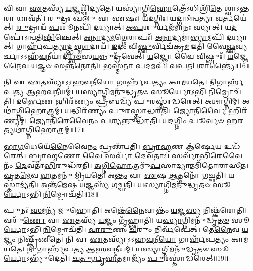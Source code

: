 𑌵𑌿 𑌵𑌾 \ul{𑌏}\-𑌤𑌸𑍍𑌯᳴ \ul{𑌯}\-𑌜𑍍𑌞𑌶𑍍𑌛𑌿᳴𑌦𑍍𑌯𑌤𑍇।
𑌯𑌸𑍍𑌯𑌾॑𑌗𑍍𑌨𑌿\-\ul{𑌹𑍋}\-𑌤𑍍𑌰𑍇᳴\-𑌽𑌧𑌿𑌶𑍍𑌰𑌿᳴\-\ul{𑌤𑍇} 𑌶𑍍𑌵𑌾\-𑌽\-\ul{𑌨𑍍𑌤}\-𑌰𑌾 𑌧𑌾𑌵᳴𑌤𑌿।
\-\ul{𑌰𑍁}\-𑌦𑍍𑌰𑌃 𑌖\-\ul{𑌲𑍁} 𑌵𑌾 \ul{𑌏}\-𑌷𑌃।
𑌯\-\ul{𑌦}\-𑌗𑍍𑌨𑌿𑌃।
𑌯𑌦𑍍𑌗𑌾𑌮᳴𑌨𑍍𑌵𑌤𑍍𑌯𑌾 \ul{𑌵}\-𑌰𑍍𑌤𑌯𑍇॑𑌤𑍍।
\-\ul{𑌰𑍁}\-𑌦𑍍𑌰𑌾𑌯᳴ \ul{𑌪}\-𑌶𑍂𑌨𑌪𑌿᳴ 𑌦𑌧𑍍𑌯𑌾𑌤𑍍।
\-\ul{𑌅}\-\-\ul{𑌪}\-𑌶𑍁𑌰𑍍𑌯𑌜᳴𑌮𑌾𑌨𑌃 𑌸𑍍𑌯𑌾𑌤𑍍।
𑌯\-\ul{𑌦}\-𑌪𑍋॑\-𑌽𑌨𑍍𑌵𑌤𑌿\-\ul{𑌷𑌿}\-𑌞𑍍𑌚𑍇𑌤𑍍।
\-\ul{𑌅}\-\-\ul{𑌨𑌾}\-𑌦𑍍𑌯\-\ul{𑌮}\-𑌗𑍍𑌨𑍇𑌰𑌾𑌪𑌃᳴।
\-\ul{𑌅}\-\-\ul{𑌨𑌾}\-𑌦𑍍𑌯𑌮𑌾॑\-\ul{𑌭𑍍𑌯𑌾}\-𑌮𑌪𑌿᳴ 𑌦𑌧𑍍𑌯𑌾𑌤𑍍।
𑌗𑌾𑌰𑍍\mbox{}𑌹᳴𑌪\-\ul{𑌤𑍍𑌯𑌾}\-𑌦𑍍𑌭\-\ul{𑌸𑍍𑌮𑌾}\-𑌦𑌾𑌯᳴।
\-\ul{𑌇}\-𑌦𑌂 𑌵𑌿\-\ul{𑌷𑍍𑌣𑍁}\-𑌰𑍍𑌵𑌿𑌚᳴𑌕𑍍𑌰\-\ul{𑌮} 𑌇𑌤𑌿᳴ 𑌵𑍈\-\ul{𑌷𑍍𑌣}\-𑌵𑍍𑌯𑌰𑍍𑌚𑌾\-𑌽𑌽𑌹᳴\-\ul{𑌵}\-𑌨𑍀𑌯𑌾॑𑌦𑍍‌\-\ul{𑌧𑍍𑌵}\-\-\ul{𑍞}\-𑌸\-\ul{𑌯}\-𑌨𑍍𑌨𑍁𑌦𑍍𑌰᳴𑌵𑍇𑌤𑍍।
\-\ul{𑌯}\-𑌜𑍍𑌞𑍋 𑌵𑍈 𑌵𑌿𑌷𑍍𑌣𑍁𑌃᳴।
\-\ul{𑌯}\-𑌜𑍍𑌞𑍇\-\ul{𑌨𑍈}\-𑌵 \ul{𑌯}\-𑌜𑍍𑌞𑍞 𑌸𑌨𑍍𑌤᳴𑌨𑍋𑌤𑌿।
𑌭𑌸𑍍𑌮᳴𑌨𑌾 \ul{𑌪}\-𑌦𑌮𑌪𑌿᳴ 𑌵𑌪\-\ul{𑌤𑌿} 𑌶𑌾𑌨𑍍𑌤𑍍𑌯𑍈॑॥16॥\anuvakamend[𑌵𑍈 \ul{𑌦𑍇}\-𑌵𑍍𑌯𑌦𑌿᳴𑌤𑌿𑌰𑍍𑌮𑍁𑌞𑍍𑌚𑌤𑌿 𑌸𑍃𑌜𑌤𑌿 𑌕𑌰𑍋𑌤𑌿 𑌕𑌰𑍋𑌤𑍍𑌯𑌾\-\ul{𑌭𑍍𑌯𑌾}\-𑌮𑌪𑌿᳴ 𑌦\-\ul{𑌧𑍍𑌯𑌾}\-𑌤𑍍 𑌪𑌞𑍍𑌚᳴ 𑌚]

𑌨𑌿 𑌵𑌾 \ul{𑌏}\-𑌤𑌸𑍍𑌯𑌾᳴\-𑌽𑌽𑌹\-\ul{𑌵}\-𑌨𑍀\-\ul{𑌯𑍋} 𑌗𑌾𑌰𑍍\mbox{}𑌹᳴𑌪𑌤𑍍𑌯𑌂 𑌕𑌾𑌮𑌯𑌤𑍇।
𑌨𑌿𑌗𑌾𑌰𑍍\mbox{}𑌹᳴𑌪𑌤𑍍𑌯 𑌆𑌹\-\ul{𑌵}\-𑌨𑍀𑌯𑌮𑍍॑।
𑌯\-\ul{𑌸𑍍𑌯𑌾}\-𑌗𑍍𑌨𑌿𑌮𑌨𑍁᳴𑌦𑍍𑌧𑍃\-\ul{𑌤}\-\-\ul{𑍞} 𑌸𑍂\-\ul{𑌰𑍍𑌯𑍋}\-𑌽𑌭𑌿 \ul{𑌨𑌿}\-𑌮𑍍𑌰𑍋𑌚᳴𑌤𑌿।
\-\ul{𑌦}\-𑌰𑍍𑌭𑍇\-\ul{𑌣} 𑌹𑌿𑌰᳴𑌣𑍍𑌯𑌂 \ul{𑌪𑍍𑌰}\-𑌬𑌦𑍍𑌧𑍍𑌯᳴ \ul{𑌪𑍁}\-𑌰𑌸𑍍𑌤𑌾॑𑌦𑍍𑌧𑌰𑍇𑌤𑍍।
𑌅\-\ul{𑌥𑌾}\-𑌗𑍍𑌨𑌿𑌮𑍍।
𑌅𑌥𑌾॑𑌗𑍍𑌨𑌿\-\ul{𑌹𑍋}\-𑌤𑍍𑌰𑌮𑍍।
𑌯𑌦𑍍𑌧𑌿𑌰᳴𑌣𑍍𑌯𑌂 \ul{𑌪𑍁}\-𑌰\-\ul{𑌸𑍍𑌤𑌾}\-𑌦𑍍𑌧𑌰᳴𑌤𑌿।
𑌜𑍍𑌯𑍋\-\ul{𑌤𑌿}\-𑌰𑍍𑌵𑍈 𑌹𑌿𑌰᳴𑌣𑍍𑌯𑌮𑍍।
𑌜𑍍𑌯𑍋𑌤𑌿᳴\-\ul{𑌰𑍇}\-𑌵𑍈\-\ul{𑌨𑌂} 𑌪\-\ul{𑌶𑍍𑌯}\-𑌨𑍍𑌨𑍁𑌦𑍍𑌧᳴𑌰𑌤𑌿।
𑌯\-\ul{𑌦}\-𑌗𑍍𑌨𑌿𑌂 𑌪𑍂\-\ul{𑌰𑍍𑌵}\-\-\ul{𑍞} 𑌹\-\ul{𑌰}\-𑌤𑍍𑌯𑌥𑌾॑𑌗𑍍𑌨𑌿\-\ul{𑌹𑍋}\-𑌤𑍍𑌰𑌮𑍍॥17॥

\-\ul{𑌭𑌾}\-\-\ul{𑌗}\-𑌧𑍇𑌯𑍇᳴\-\ul{𑌨𑍈}\-𑌵𑍈\-\ul{𑌨𑌂} 𑌪𑍍𑌰𑌣᳴𑌯𑌤𑌿।
\-\ul{𑌬𑍍𑌰𑌾}\-\-\ul{𑌹𑍍𑌮}\-𑌣 𑌆᳴𑌰𑍍\mbox{}\-\ul{𑌷𑍇}\-𑌯 𑌉𑌦𑍍𑌧᳴𑌰𑍇𑌤𑍍।
\-\ul{𑌬𑍍𑌰𑌾}\-\-\ul{𑌹𑍍𑌮}\-𑌣𑍋 𑌵𑍈 𑌸𑌰𑍍𑌵𑌾᳴ \ul{𑌦𑍇}\-𑌵𑌤𑌾𑌃॑।
𑌸𑌰𑍍𑌵𑌾᳴𑌭𑌿\-\ul{𑌰𑍇}\-𑌵𑍈𑌨𑌂᳴ \ul{𑌦𑍇}\-𑌵𑌤𑌾᳴\-\ul{𑌭𑌿}\-𑌰𑍁𑌦𑍍𑌧᳴𑌰𑌤𑌿।
\-\ul{𑌅}\-\-\ul{𑌗𑍍𑌨𑌿}\-\-\ul{𑌹𑍋}\-𑌤𑍍𑌰𑌮𑍁᳴\-\ul{𑌪}\-𑌸𑌾𑌦𑍍𑌯𑌾𑌤𑌮𑌿᳴𑌤𑍋𑌰𑌾𑌸𑍀𑌤।
\-\ul{𑌵𑍍𑌰}\-𑌤\-\ul{𑌮𑍇}\-𑌵 \ul{𑌹}\-𑌤𑌮𑌨𑍁᳴ 𑌮𑍍𑌰𑌿𑌯𑌤𑍇।
𑌅\-\ul{𑌨𑍍𑌤𑌂} 𑌵𑌾 \ul{𑌏}\-𑌷 \ul{𑌆}\-𑌤𑍍𑌮𑌨𑍋᳴ 𑌗𑌚𑍍𑌛𑌤𑌿।
𑌯𑌸𑍍𑌤𑌾𑌮𑍍𑌯᳴𑌤𑌿।
𑌅𑌨𑍍𑌤᳴\-\ul{𑌮𑍇}\-𑌷 \ul{𑌯}\-𑌜𑍍𑌞𑌸𑍍𑌯᳴ 𑌗𑌚𑍍𑌛𑌤𑌿।
𑌯\-\ul{𑌸𑍍𑌯𑌾}\-𑌗𑍍𑌨𑌿𑌮𑌨𑍁᳴𑌦𑍍𑌧𑍃\-\ul{𑌤}\-\-\ul{𑍞} 𑌸𑍂\-\ul{𑌰𑍍𑌯𑍋}\-𑌽𑌭𑌿 \ul{𑌨𑌿}\-𑌮𑍍𑌰𑍋𑌚᳴𑌤𑌿॥18॥

𑌪𑍁𑌨𑌃᳴ \ul{𑌸}\-𑌮𑌨𑍍𑌯᳴ 𑌜𑍁𑌹𑍋𑌤𑌿।
𑌅𑌨𑍍𑌤𑍇᳴\-\ul{𑌨𑍈}\-𑌵𑌾𑌨𑍍𑌤𑌂᳴ \ul{𑌯}\-𑌜𑍍𑌞\-\ul{𑌸𑍍𑌯} 𑌨𑌿𑌷𑍍𑌕᳴𑌰𑍋𑌤𑌿।
𑌵𑌰𑍁᳴\-\ul{𑌣𑍋} 𑌵𑌾 \ul{𑌏}\-𑌤𑌸𑍍𑌯᳴ \ul{𑌯}\-𑌜𑍍𑌞𑌂 𑌗𑍃᳴𑌹𑍍𑌣𑌾𑌤𑌿।
𑌯\-\ul{𑌸𑍍𑌯𑌾}\-𑌗𑍍𑌨𑌿𑌮𑌨𑍁᳴𑌦𑍍𑌧𑍃\-\ul{𑌤}\-\-\ul{𑍞} 𑌸𑍂\-\ul{𑌰𑍍𑌯𑍋}\-𑌽𑌭𑌿 \ul{𑌨𑌿}\-𑌮𑍍𑌰𑍋𑌚᳴𑌤𑌿।
\-\ul{𑌵𑌾}\-\-\ul{𑌰𑍁}\-𑌣𑌂 \ul{𑌚}\-𑌰𑍁𑌂 𑌨𑌿𑌰𑍍𑌵᳴𑌪𑍇𑌤𑍍।
𑌤𑍇\-\ul{𑌨𑍈}\-𑌵 \ul{𑌯}\-𑌜𑍍𑌞𑌂 𑌨𑌿𑌷𑍍𑌕𑍍𑌰𑍀᳴𑌣𑍀𑌤𑍇।
𑌨𑌿 𑌵𑌾 \ul{𑌏}\-𑌤𑌸𑍍𑌯𑌾᳴\-𑌽𑌽𑌹\-\ul{𑌵}\-𑌨𑍀\-\ul{𑌯𑍋} 𑌗𑌾𑌰𑍍\mbox{}𑌹᳴𑌪𑌤𑍍𑌯𑌂 𑌕𑌾𑌮𑌯𑌤𑍇।
𑌨𑌿 𑌗𑌾𑌰𑍍\mbox{}𑌹᳴𑌪𑌤𑍍𑌯 𑌆𑌹\-\ul{𑌵}\-𑌨𑍀𑌯𑌮𑍍॑।
𑌯\-\ul{𑌸𑍍𑌯𑌾}\-𑌗𑍍𑌨𑌿𑌮𑌨𑍁᳴𑌦𑍍𑌧𑍃\-\ul{𑌤}\-\-\ul{𑍞} 𑌸𑍂\-\ul{𑌰𑍍𑌯𑍋}\-\-𑌽𑌭𑍍𑌯𑍁᳴𑌦𑍇𑌤𑌿᳴।
\-\ul{𑌚}\-\-\ul{𑌤𑍁}\-\-\ul{𑌰𑍍𑌗𑍃}\-\-\ul{𑌹𑍀}\-𑌤𑌮𑌾𑌜𑍍𑌯𑌂᳴ \ul{𑌪𑍁}\-𑌰𑌸𑍍𑌤𑌾॑𑌦𑍍𑌧𑌰𑍇𑌤𑍍॥19॥

